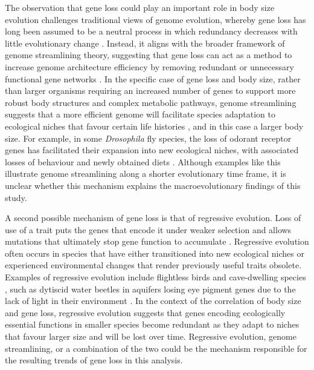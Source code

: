 \documentclass[11pt]{article}
\begin{document}
The observation that gene loss could play an important role in body size evolution challenges traditional views of genome evolution, whereby gene loss has long been assumed to be a neutral process in which redundancy decreases with little evolutionary change \citep{evolution-by-gene-loss}. Instead, it aligns with the broader framework of genome streamlining theory, suggesting that gene loss can act as a method to increase genome architecture efficiency by removing redundant or unnecessary functional gene networks \citep{olson}. In the specific case of gene loss and body size, rather than larger organisms requiring an increased number of genes to support more robust body structures and complex metabolic pathways, genome streamlining suggests that a more efficient genome will facilitate species adaptation to ecological niches that favour certain life histories \citep{genome-streamlining}, and in this case a larger body size. For example, in some \textit{Drosophila} fly species, the loss of odorant receptor genes has facilitated their expansion into new ecological niches, with associated losses of behaviour and newly obtained diets \citep{drosophila-gene-loss}. Although examples like this illustrate genome streamlining along a shorter evolutionary time frame, it is unclear whether this mechanism explains the macroevolutionary findings of this study.

A second possible mechanism of gene loss is that of regressive evolution. Loss of use of a trait puts the genes that encode it under weaker selection and allows mutations that ultimately stop gene function to accumulate \citep{evolution-by-gene-loss}. Regressive evolution often occurs in species that have either transitioned into new ecological niches or experienced environmental changes that render previously useful traits obsolete. Examples of regressive evolution include flightless birds and cave-dwelling species \citep{cave-dwelling-flight}, such as dytiscid water beetles in aquifers losing eye pigment genes due to the lack of light in their environment \citep{cave-beetles}. In the context of the correlation of body size and gene loss, regressive evolution suggests that genes encoding ecologically essential functions in smaller species become redundant as they adapt to niches that favour larger size and will be lost over time. Regressive evolution, genome streamlining, or a combination of the two could be the mechanism responsible for the resulting trends of gene loss in this analysis.
\end{document}
